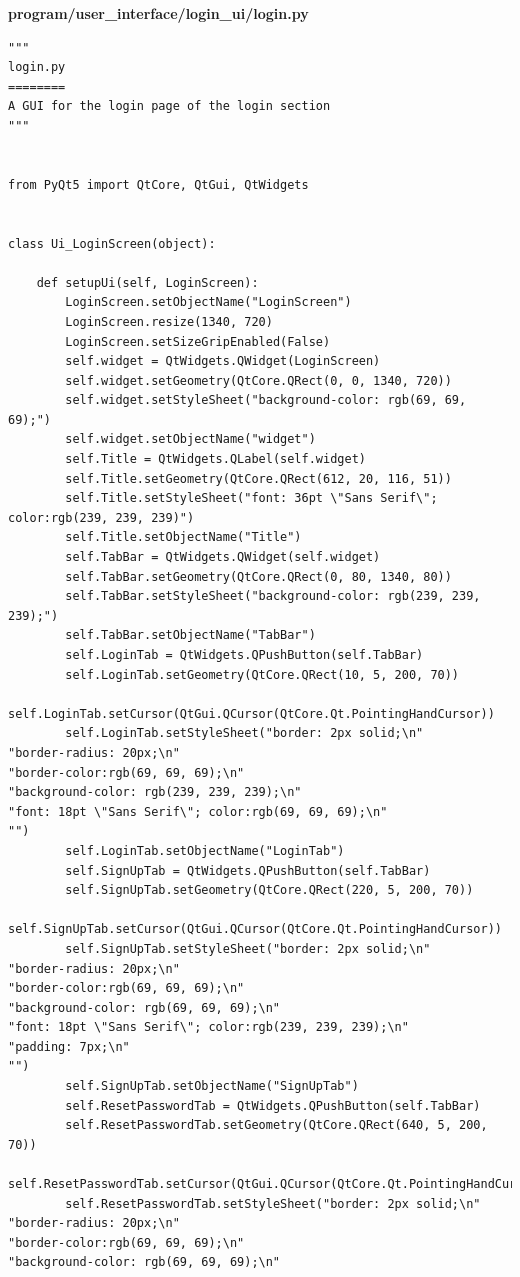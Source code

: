 \documentclass{article}
\begin{document}
\textbf{program/user\_interface/login\_ui/login.py}
\begin{lstlisting}
"""
login.py
========
A GUI for the login page of the login section
"""


from PyQt5 import QtCore, QtGui, QtWidgets


class Ui_LoginScreen(object):

    def setupUi(self, LoginScreen):
        LoginScreen.setObjectName("LoginScreen")
        LoginScreen.resize(1340, 720)
        LoginScreen.setSizeGripEnabled(False)
        self.widget = QtWidgets.QWidget(LoginScreen)
        self.widget.setGeometry(QtCore.QRect(0, 0, 1340, 720))
        self.widget.setStyleSheet("background-color: rgb(69, 69, 69);")
        self.widget.setObjectName("widget")
        self.Title = QtWidgets.QLabel(self.widget)
        self.Title.setGeometry(QtCore.QRect(612, 20, 116, 51))
        self.Title.setStyleSheet("font: 36pt \"Sans Serif\"; color:rgb(239, 239, 239)")
        self.Title.setObjectName("Title")
        self.TabBar = QtWidgets.QWidget(self.widget)
        self.TabBar.setGeometry(QtCore.QRect(0, 80, 1340, 80))
        self.TabBar.setStyleSheet("background-color: rgb(239, 239, 239);")
        self.TabBar.setObjectName("TabBar")
        self.LoginTab = QtWidgets.QPushButton(self.TabBar)
        self.LoginTab.setGeometry(QtCore.QRect(10, 5, 200, 70))
        self.LoginTab.setCursor(QtGui.QCursor(QtCore.Qt.PointingHandCursor))
        self.LoginTab.setStyleSheet("border: 2px solid;\n"
"border-radius: 20px;\n"
"border-color:rgb(69, 69, 69);\n"
"background-color: rgb(239, 239, 239);\n"
"font: 18pt \"Sans Serif\"; color:rgb(69, 69, 69);\n"
"")
        self.LoginTab.setObjectName("LoginTab")
        self.SignUpTab = QtWidgets.QPushButton(self.TabBar)
        self.SignUpTab.setGeometry(QtCore.QRect(220, 5, 200, 70))
        self.SignUpTab.setCursor(QtGui.QCursor(QtCore.Qt.PointingHandCursor))
        self.SignUpTab.setStyleSheet("border: 2px solid;\n"
"border-radius: 20px;\n"
"border-color:rgb(69, 69, 69);\n"
"background-color: rgb(69, 69, 69);\n"
"font: 18pt \"Sans Serif\"; color:rgb(239, 239, 239);\n"
"padding: 7px;\n"
"")
        self.SignUpTab.setObjectName("SignUpTab")
        self.ResetPasswordTab = QtWidgets.QPushButton(self.TabBar)
        self.ResetPasswordTab.setGeometry(QtCore.QRect(640, 5, 200, 70))
        self.ResetPasswordTab.setCursor(QtGui.QCursor(QtCore.Qt.PointingHandCursor))
        self.ResetPasswordTab.setStyleSheet("border: 2px solid;\n"
"border-radius: 20px;\n"
"border-color:rgb(69, 69, 69);\n"
"background-color: rgb(69, 69, 69);\n"

\end{lstlisting}
\end{document}
